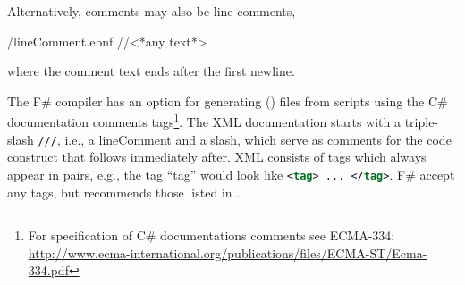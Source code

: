 \documentclass[springer.tex]{subfiles}
\begin{document}
Alternatively, comments may also be line comments,
%
\begin{verbatimwrite}{\ebnf/lineComment.ebnf}
//<*any text*>
\end{verbatimwrite}
%
where the comment text ends after the first newline.

The F\# compiler has an option for generating  () files from scripts using the C\# documentation comments tags\footnote{For specification of C\# documentations comments see ECMA-334: \url{http://www.ecma-international.org/publications/files/ECMA-ST/Ecma-334.pdf}}. The XML documentation starts with a triple-slash \lstinline{///}, i.e., a lineComment and a slash, which serve as comments for the code construct that follows immediately after. XML consists of tags which always appear in pairs, e.g., the tag ``tag'' would look like \lstinline[language=xml]!<tag> ... </tag>!. F\# accept any tags, but recommends those listed in .
\end{document}
